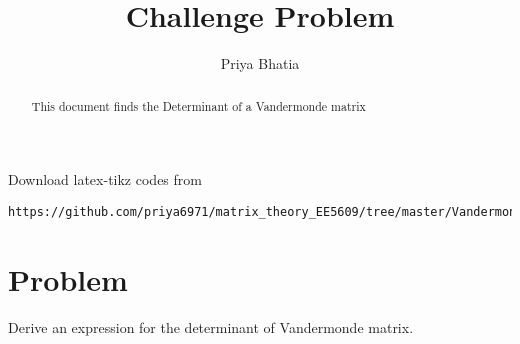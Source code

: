 \documentclass[journal,12pt,twocolumn]{IEEEtran}
\begin{document}
     \def\rightbox#1{\makebox[0in][r]{#1}}
     \def\centbox#1{\makebox[0in]{#1}}
     \def\topbox#1{\raisebox{-\baselineskip}[0in][0in]{#1}}
     \def\midbox#1{\raisebox{-0.5\baselineskip}[0in][0in]{#1}}
\vspace{3cm}
\title{Challenge Problem}
\author{Priya Bhatia}
\maketitle
\newpage
\bigskip
\renewcommand{\thefigure}{\theenumi}
\renewcommand{\thetable}{\theenumi}
\begin{abstract}
This document finds the Determinant of a Vandermonde matrix
\end{abstract}
Download latex-tikz codes from 
%
\begin{lstlisting}
https://github.com/priya6971/matrix_theory_EE5609/tree/master/Vandermonde_Matrix
\end{lstlisting}
%
\section{\textbf{Problem}}
Derive an expression for the determinant of Vandermonde matrix.
\end{document}
